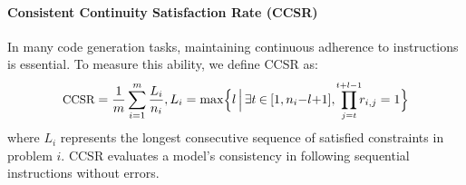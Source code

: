 \paragraph{Consistent Continuity Satisfaction Rate (CCSR)}
In many code generation tasks, maintaining continuous adherence to instructions is essential. To measure this ability, we define CCSR as:
\begin{equation}
\small
\text{CCSR} = \frac{1}{m} \sum_{i=1}^{m} \frac{L_i}{n_i}, \\
L_i = \max \Bigl\{ l \,\Big|\, \exists t \mathbin{\in} [1, n_i{-}l{+}1],\ 
\prod_{\mathclap{j=t}}^{\mathclap{t+l-1}} r_{i,j} = 1 \Bigr\}
\end{equation}
where $L_i$ represents the longest consecutive sequence of satisfied constraints in problem $i$. CCSR evaluates a model’s consistency in following sequential instructions without errors.


